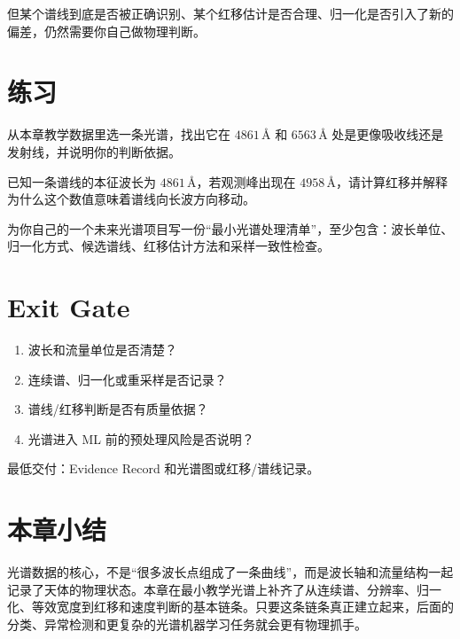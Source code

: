 但某个谱线到底是否被正确识别、某个红移估计是否合理、归一化是否引入了新的偏差，仍然需要你自己做物理判断。

\section{练习}

\begin{exercisebox}[基础练习]
从本章教学数据里选一条光谱，找出它在 $4861\,\text{\AA}$ 和 $6563\,\text{\AA}$ 处是更像吸收线还是发射线，并说明你的判断依据。
\end{exercisebox}

\begin{exercisebox}[进阶练习]
已知一条谱线的本征波长为 $4861\,\text{\AA}$，若观测峰出现在 $4958\,\text{\AA}$，请计算红移并解释为什么这个数值意味着谱线向长波方向移动。
\end{exercisebox}

\begin{exercisebox}[开放练习]
为你自己的一个未来光谱项目写一份“最小光谱处理清单”，至少包含：波长单位、归一化方式、候选谱线、红移估计方法和采样一致性检查。
\end{exercisebox}

\section{Exit Gate}

\begin{enumerate}
    \item 波长和流量单位是否清楚？
    \item 连续谱、归一化或重采样是否记录？
    \item 谱线/红移判断是否有质量依据？
    \item 光谱进入 ML 前的预处理风险是否说明？
\end{enumerate}

最低交付：Evidence Record 和光谱图或红移/谱线记录。

\section{本章小结}

光谱数据的核心，不是“很多波长点组成了一条曲线”，而是波长轴和流量结构一起记录了天体的物理状态。本章在最小教学光谱上补齐了从连续谱、分辨率、归一化、等效宽度到红移和速度判断的基本链条。只要这条链条真正建立起来，后面的分类、异常检测和更复杂的光谱机器学习任务就会更有物理抓手。
